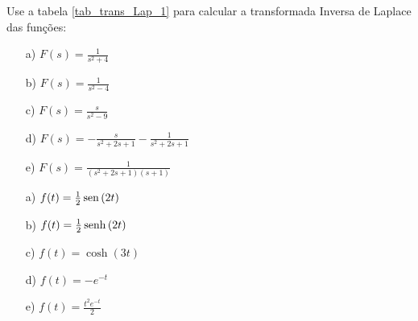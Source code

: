  \begin{exer}Use a tabela \ref{tab_trans_Lap_1} para calcular a transformada Inversa de Laplace das funções:
 \begin{itemize}
  \item[a)] $F(s)=\frac{1}{s^2+4}$
  \item[b)] $F(s)=\frac{1}{s^2-4}$
  \item[c)] $F(s)=\frac{s}{s^2-9}$
  \item[d)] $F(s)=-\frac{s}{s^2+2s+1}-\frac{1}{s^2+2s+1}$ 
  \item[e)] $F(s)=\frac{1}{(s^2+2s+1)(s+1)}$ 
 \end{itemize}
\end{exer}
\begin{resp}
 \begin{itemize}
  \item[a)] $f(t)=\frac{1}{2}\operatorname{sen}\,(2t)$
  \item[b)] $f(t)=\frac{1}{2}\operatorname{senh}\,(2t)$ 
  \item[c)] $f(t)=\cosh(3t)$
  \item[d)] $f(t)=-e^{-t}$ 
  \item[e)] $f(t)=\frac{t^2e^{-t}}{2}$ 
  \end{itemize}
\end{resp}
